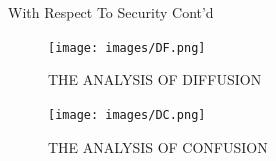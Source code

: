\begin{frame}{With Respect To Security Cont'd}
	\begin{itemize}
    \begin{figure}
    \centering
    \texttt{[image: images/DF.png]} 
    \caption{THE ANALYSIS OF DIFFUSION}
    \label{fig:6distinguisher}
\end{figure} 
    \begin{figure}
    \centering
    \texttt{[image: images/DC.png]} 
    \caption{THE ANALYSIS OF CONFUSION}
    \label{fig:6distinguisher}
\end{figure} 
	\end{itemize}
\end{frame}





